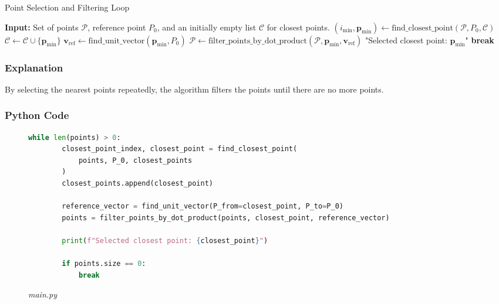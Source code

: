 \documentclass[12pt,a4paper]{report}
\begin{document}
\begin{algorithm}
\caption{Point Selection and Filtering Loop}
\begin{algorithmic}[1]
\State \textbf{Input:} Set of points $\mathcal{P}$, reference point $P_0$, and an initially empty list $\mathcal{C}$ for closest points.
    \State $(i_{\text{min}}, \mathbf{p}_{\text{min}}) \gets \text{find\_closest\_point}(\mathcal{P}, P_0, \mathcal{C})$
    \State $\mathcal{C} \gets \mathcal{C} \cup \{\mathbf{p}_{\text{min}}\}$
    \State $\mathbf{v}_{\text{ref}} \gets \text{find\_unit\_vector}(\mathbf{p}_{\text{min}}, P_0)$
    \State $\mathcal{P} \gets \text{filter\_points\_by\_dot\_product}(\mathcal{P}, \mathbf{p}_{\text{min}}, \mathbf{v}_{\text{ref}})$
    \State {} "Selected closest point: $\mathbf{p}_{\text{min}}$"
        \State \textbf{break}
    \EndIf
\EndWhile
\end{algorithmic}
\end{algorithm}


\subsubsection{Explanation}

By selecting the nearest points repeatedly, the algorithm filters the points until there are no more points.


\subsubsection{Python Code}
\begin{figure}[ht!]
\centering
\caption*{\large\textit{main.py}}
\begin{lstlisting}[language=Python, caption={Point Selection and Filtering Loop}]
    while len(points) > 0:
        closest_point_index, closest_point = find_closest_point(
            points, P_0, closest_points
        )
        closest_points.append(closest_point)
    
        reference_vector = find_unit_vector(P_from=closest_point, P_to=P_0)
        points = filter_points_by_dot_product(points, closest_point, reference_vector)
    
        print(f"Selected closest point: {closest_point}")
    
        if points.size == 0:
            break
\end{lstlisting}
\end{figure}
\end{document}
